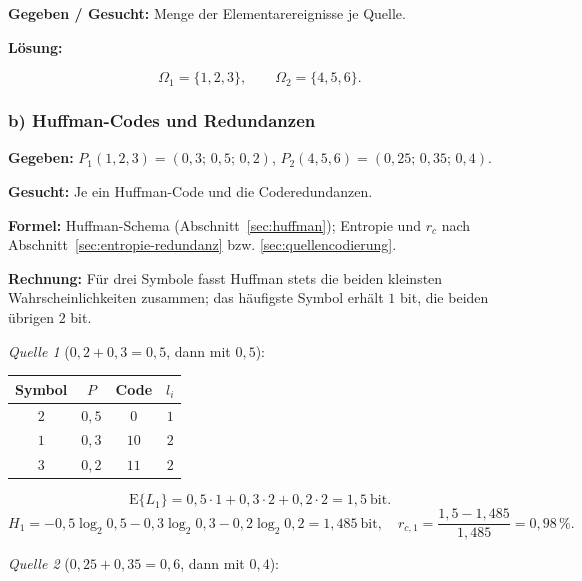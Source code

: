 \begin{beispiel}

\textbf{Gegeben / Gesucht:} Menge der Elementarereignisse je Quelle.

\textbf{Lösung:}

$$
\boxed{\;\Omega_1 = \{1,2,3\}, \qquad \Omega_2 = \{4,5,6\}.\;}
$$

\end{beispiel}

\subsubsection*{b) Huffman-Codes und Redundanzen}

\begin{beispiel}

\textbf{Gegeben:} $P_1(1,2,3) = (0{,}3;\,0{,}5;\,0{,}2)$,
$P_2(4,5,6) = (0{,}25;\,0{,}35;\,0{,}4)$.

\textbf{Gesucht:} Je ein Huffman-Code und die Coderedundanzen.

\textbf{Formel:} Huffman-Schema (Abschnitt~\ref{sec:huffman}); Entropie und
$r_c$ nach Abschnitt~\ref{sec:entropie-redundanz} bzw.
\ref{sec:quellencodierung}.

\textbf{Rechnung:} Für drei Symbole fasst Huffman stets die beiden kleinsten
Wahrscheinlichkeiten zusammen; das häufigste Symbol erhält $1$ bit, die beiden
übrigen $2$ bit.

\emph{Quelle 1} ($0{,}2 + 0{,}3 = 0{,}5$, dann mit $0{,}5$):

\begin{center}
\begin{tabular}{c|c|c|c}
Symbol & $P$ & Code & $l_i$ \\ \hline
$2$ & $0{,}5$ & $0$  & $1$ \\
$1$ & $0{,}3$ & $10$ & $2$ \\
$3$ & $0{,}2$ & $11$ & $2$ \\
\end{tabular}
\end{center}

$$
\mathrm{E}\{L_1\} = 0{,}5\cdot 1 + 0{,}3\cdot 2 + 0{,}2\cdot 2 = 1{,}5\ \text{bit}.
$$
$$
H_1 = -0{,}5\log_2 0{,}5 - 0{,}3\log_2 0{,}3 - 0{,}2\log_2 0{,}2 = 1{,}485\ \text{bit},
\quad
r_{c,1} = \frac{1{,}5 - 1{,}485}{1{,}485} = 0{,}98\,\%.
$$

\emph{Quelle 2} ($0{,}25 + 0{,}35 = 0{,}6$, dann mit $0{,}4$):


\end{beispiel}
